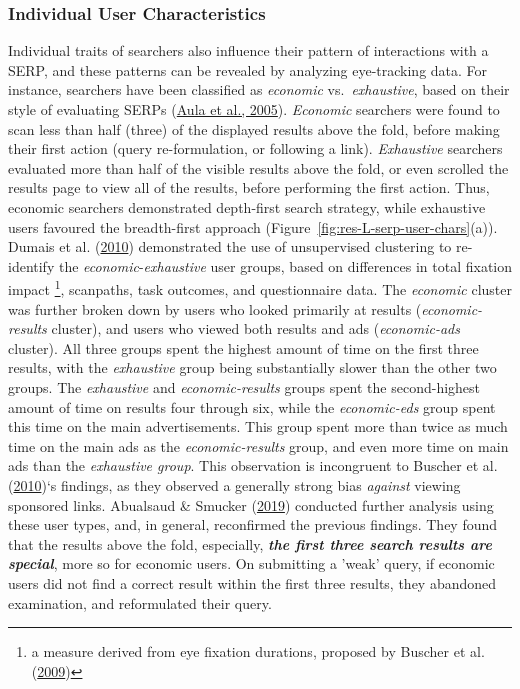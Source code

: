 \documentclass[letterpaper, nobind]{templates/ociamthesis}
\begin{document}
\hypertarget{individual-user-characteristics}{%
\subsubsection{Individual User Characteristics}\label{individual-user-characteristics}}

Individual traits of searchers also influence their pattern of
interactions with a SERP, and these patterns can be revealed by
analyzing eye-tracking data. For instance, searchers have been
classified as \emph{economic} vs.~\emph{exhaustive}, based on their style of
evaluating SERPs (\protect\hyperlink{ref-102}{Aula et al., 2005}). \emph{Economic} searchers were found to scan less
than half (three) of the displayed results above the fold, before making
their first action (query re-formulation, or following a link).
\emph{Exhaustive} searchers evaluated more than half of the visible results
above the fold, or even scrolled the results page to view all of the
results, before performing the first action. Thus, economic searchers
demonstrated depth-first search strategy, while exhaustive users
favoured the breadth-first approach
(Figure~\ref{fig:res-L-serp-user-chars}(a)). Dumais et al. (\protect\hyperlink{ref-117}{2010}) demonstrated the use of
unsupervised clustering to re-identify the \emph{economic}-\emph{exhaustive} user
groups, based on differences in total fixation impact \footnote{
  a measure derived from eye fixation durations, proposed by Buscher et al. (\protect\hyperlink{ref-110}{2009})}, scanpaths,
task outcomes, and questionnaire data. The \emph{economic} cluster was
further broken down by users who looked primarily at results
(\emph{economic-results} cluster), and users who viewed both results and ads
(\emph{economic-ads} cluster). All three groups spent the highest amount of
time on the first three results, with the \emph{exhaustive} group being
substantially slower than the other two groups. The \emph{exhaustive} and
\emph{economic-results} groups spent the second-highest amount of time on
results four through six, while the \emph{economic-eds} group spent this time
on the main advertisements. This group spent more than twice as much
time on the main ads as the \emph{economic-results} group, and even more time
on main ads than the \emph{exhaustive group}. This observation is incongruent
to Buscher et al. (\protect\hyperlink{ref-115}{2010})`s findings, as they observed a generally strong bias \emph{against}
viewing sponsored links. Abualsaud \& Smucker (\protect\hyperlink{ref-135}{2019}) conducted further analysis using these
user types, and, in general, reconfirmed the previous findings. They
found that the results above the fold, especially, \textbf{\emph{the first three
search results are special}}, more so for economic users. On submitting
a 'weak' query, if economic users did not find a correct result within
the first three results, they abandoned examination, and reformulated
their query.
\end{document}
